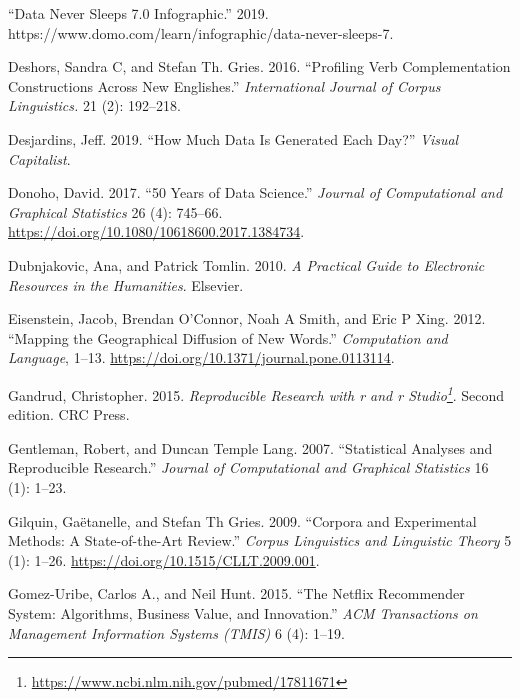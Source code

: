\documentclass[
  letterpaper,
]{scrbook}
\newlength{\cslhangindent}
\newlength{\cslentryspacingunit} %
\newenvironment{CSLReferences}[2] %
 {%
  \setlength{\parindent}{0pt}
  \ifodd #1
  \let\oldpar\par
  \def\par{\hangindent=\cslhangindent\oldpar}
  \fi
  \setlength{\parskip}{#2\cslentryspacingunit}
 }%
 {}
\DeclareRobustCommand{\href}[2]{#2\footnote{\url{#1}}}
\begin{document}
\begin{CSLReferences}{1}{0}
\leavevmode{}%
{``Data Never Sleeps 7.0 Infographic.''} 2019.
https://www.domo.com/learn/infographic/data-never-sleeps-7.

\leavevmode{}%
Deshors, Sandra C, and Stefan Th. Gries. 2016. {``Profiling Verb
Complementation Constructions Across New Englishes.''}
\emph{International Journal of Corpus Linguistics.} 21 (2): 192--218.

\leavevmode{}%
Desjardins, Jeff. 2019. {``How Much Data Is Generated Each Day?''}
\emph{Visual Capitalist}.

\leavevmode{}%
Donoho, David. 2017. {``50 Years of Data Science.''} \emph{Journal of
Computational and Graphical Statistics} 26 (4): 745--66.
\url{https://doi.org/10.1080/10618600.2017.1384734}.

\leavevmode{}%
Dubnjakovic, Ana, and Patrick Tomlin. 2010. \emph{A Practical Guide to
Electronic Resources in the Humanities}. Elsevier.

\leavevmode{}%
Eisenstein, Jacob, Brendan O'Connor, Noah A Smith, and Eric P Xing.
2012. {``Mapping the Geographical Diffusion of New Words.''}
\emph{Computation and Language}, 1--13.
\url{https://doi.org/10.1371/journal.pone.0113114}.

\leavevmode{}%
Gandrud, Christopher. 2015.
\emph{\href{https://www.ncbi.nlm.nih.gov/pubmed/17811671}{Reproducible
Research with r and r Studio}}. Second edition. CRC Press.

\leavevmode{}%
Gentleman, Robert, and Duncan Temple Lang. 2007. {``Statistical Analyses
and Reproducible Research.''} \emph{Journal of Computational and
Graphical Statistics} 16 (1): 1--23.

\leavevmode{}%
Gilquin, Gaëtanelle, and Stefan Th Gries. 2009. {``Corpora and
Experimental Methods: A State-of-the-Art Review.''} \emph{Corpus
Linguistics and Linguistic Theory} 5 (1): 1--26.
\url{https://doi.org/10.1515/CLLT.2009.001}.

\leavevmode{}%
Gomez-Uribe, Carlos A., and Neil Hunt. 2015. {``The Netflix Recommender
System: Algorithms, Business Value, and Innovation.''} \emph{ACM
Transactions on Management Information Systems (TMIS)} 6 (4): 1--19.


\end{CSLReferences}
\end{document}
